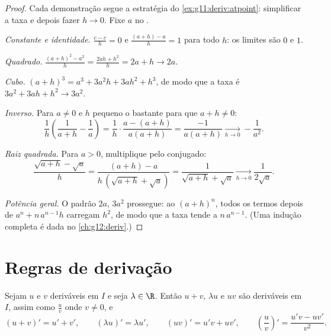 \begin{proof}
Cada demonstração segue a estratégia do \cref{ex:g11:deriv:atpoint}:
simplificar a taxa e depois fazer $h \to 0$. Fixe $a$ no .

\emph{Constante e identidade.} $\frac{c - c}{h} = 0$ e
$\frac{(a+h) - a}{h} = 1$ para todo $h$: os limites são $0$ e $1$.

\emph{Quadrado.} $\frac{(a+h)^2 - a^2}{h} = \frac{2ah + h^2}{h} = 2a + h
\to 2a$.

\emph{Cubo.} $(a+h)^3 = a^3 + 3a^2h + 3ah^2 + h^3$, de modo que a taxa é
$3a^2 + 3ah + h^2 \to 3a^2$.

\emph{Inverso.} Para $a \neq 0$ e $h$ pequeno o bastante para que
$a + h \neq 0$:
\[
\frac{1}{h}\left(\frac{1}{a+h} - \frac{1}{a}\right)
= \frac{1}{h} \cdot \frac{a - (a+h)}{a(a+h)}
= \frac{-1}{a(a+h)}
\xrightarrow[h \to 0]{} -\frac{1}{a^2}.
\]

\emph{Raiz quadrada.} Para $a > 0$, multiplique pelo conjugado:
\[
\frac{\sqrt{a+h} - \sqrt a}{h}
= \frac{(a + h) - a}{h\,(\sqrt{a+h} + \sqrt a)}
= \frac{1}{\sqrt{a+h} + \sqrt a}
\xrightarrow[h \to 0]{} \frac{1}{2\sqrt a}.
\]

\emph{Potência geral.} O padrão $2a$, $3a^2$ prossegue: ao 
$(a+h)^n$, todos os termos depois de $a^n + n\,a^{n-1}h$ carregam $h^2$,
de modo que a taxa tende a $n\,a^{n-1}$. (Uma indução completa é dada no
\cref{ch:g12:deriv}.)
\end{proof}

\section{Regras de derivação}

\begin{theorem}[Operações]\label{thm:g11:deriv:rules}
Sejam $u$ e $v$ deriváveis em $I$ e seja $\lambda \in \R$. Então
$u + v$, $\lambda u$ e $uv$ são deriváveis em $I$, assim como
$\frac{u}{v}$ onde $v \neq 0$, e
\[
(u+v)' = u' + v', \qquad
(\lambda u)' = \lambda u', \qquad
(uv)' = u'v + uv', \qquad
\left(\frac{u}{v}\right)' = \frac{u'v - uv'}{v^2}.
\]
\end{theorem}


